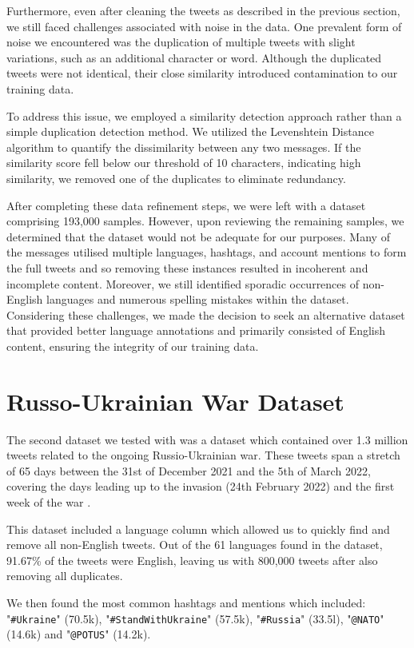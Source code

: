 Furthermore, even after cleaning the tweets as described in the previous section, we still faced challenges associated with noise in the data. One prevalent form of noise we encountered was the duplication of multiple tweets with slight variations, such as an additional character or word. Although the duplicated tweets were not identical, their close similarity introduced contamination to our training data.

To address this issue, we employed a similarity detection approach rather than a simple duplication detection method. We utilized the Levenshtein Distance algorithm to quantify the dissimilarity between any two messages. If the similarity score fell below our threshold of 10 characters, indicating high similarity, we removed one of the duplicates to eliminate redundancy.

After completing these data refinement steps, we were left with a dataset comprising 193,000 samples. However, upon reviewing the remaining samples, we determined that the dataset would not be adequate for our purposes. Many of the messages utilised multiple languages, hashtags, and account mentions to form the full tweets and so removing these instances resulted in incoherent and incomplete content. Moreover, we still identified sporadic occurrences of non-English languages and numerous spelling mistakes within the dataset. Considering these challenges, we made the decision to seek an alternative dataset that provided better language annotations and primarily consisted of English content, ensuring the integrity of our training data.


\section{Russo-Ukrainian War Dataset}

The second dataset we tested with was a dataset which contained over 1.3 million tweets related to the ongoing Russio-Ukrainian war. These tweets span a stretch of 65 days between the 31st of December 2021 and the 5th of March 2022, covering the days leading up to the invasion (24th February 2022) and the first week of the war \cite{ukraine-war-dataset}.

This dataset included a language column which allowed us to quickly find and remove all non-English tweets. Out of the 61 languages found in the dataset, 91.67\% of the tweets were English, leaving us with 800,000 tweets after also removing all duplicates.

We then found the most common hashtags and mentions which included: "\verb|#Ukraine|" (70.5k), "\verb|#StandWithUkraine|" (57.5k), "\verb|#Russia|" (33.5l), "\verb|@NATO|" (14.6k) and "\verb|@POTUS|" (14.2k).

